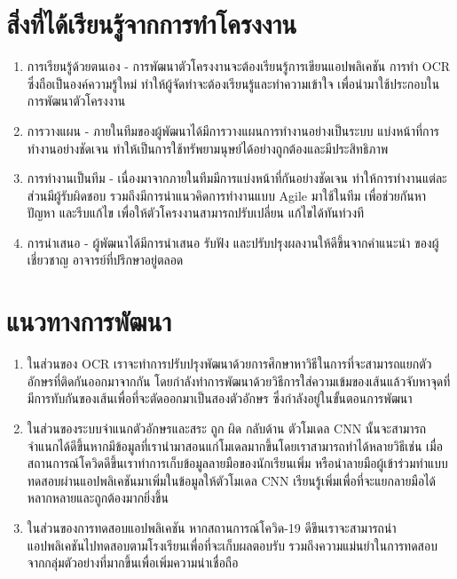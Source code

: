 \documentclass[12pt,oneside,openright,a4paper]{cpe-thai-project}
\begin{document}
\section{สิ่งที่ได้เรียนรู้จากการทำโครงงาน}
\begin{enumerate}
  \item การเรียนรู้ด้วยตนเอง - การพัฒนาตัวโครงงานจะต้องเรียนรู้การเขียนแอปพลิเคชัน
  การทำ OCR ซึ่งถือเป็นองค์ความรู้ใหม่ ทำให้ผู้จัดทำจะต้องเรียนรู้และทำความเข้าใจ
  เพื่อนำมาใช้ประกอบในการพัฒนาตัวโครงงาน
  \item การวางแผน - ภายในทีมของผู้พัฒนาได้มีการวางแผนการทำงานอย่างเป็นระบบ
  แบ่งหน้าที่การทำงานอย่างชัดเจน 
  ทำให้เป็นการใช้ทรัพยามนุษย์ได้อย่างถูกต้องและมีประสิทธิภาพ
  \item การทำงานเป็นทีม - เนื่องมาจากภายในทีมมีการแบ่งหน้าที่กันอย่างชัดเจน
  ทำให้การทำงานแต่ละส่วนมีผู้รับผิดชอบ รวมถึงมีการนำแนวคิดการทำงานแบบ Agile
  มาใช้ในทีม เพื่อช่วยกันหาปัญหา และรีบแก้ไข เพื่อให้ตัวโครงงานสามารถปรับเปลี่ยน
  แก้ไขได้ทันท่วงที
  \item การนำเสนอ - ผู้พัฒนาได้มีการนำเสนอ รับฟัง และปรับปรุงผลงานให้ดีขึ้นจากคำแนะนำ
  ของผู้เชี่ยวชาญ อาจารย์ที่ปรึกษาอยู่ตลอด
\end{enumerate}
\section{แนวทางการพัฒนา}
\begin{enumerate}
  \item ในส่วนของ OCR เราจะทำการปรับปรุงพัฒนาด้วยการศึกษาหาวิธีในการที่จะสามารถแยกตัวอักษรที่ติดกันออกมาจากกัน โดยกำลังทำการพัฒนาด้วยวิธีการใส่ความเข้มของเส้นแล้วจับหาจุดที่มีการทับกันของเส้นเพื่อที่จะตัดออกมาเป็นสองตัวอักษร ซึ่งกำลังอยู่ในขั้นตอนการพัฒนา
  \item ในส่วนของระบบจำแนกตัวอักษรและสระ ถูก ผิด กลับด้าน
        ตัวโมเดล CNN นั้นจะสามารถจำแนกได้ดีขึ้นหากมีข้อมูลที่เรานำมาสอนแก่โมเดลมากขึ้นโดยเราสามารถทำได้หลายวิธีเช่น เมื่อสถานการณ์โควิดดีขึ้นเราทำการเก็บข้อมูลลายมือของนักเรียนเพิ่ม หรือนำลายมือผู้เข้าร่วมทำแบบทดสอบผ่านแอปพลิเคชันมาเพิ่มในข้อมูลให้ตัวโมเดล CNN เรียนรู้เพิ่มเพื่อที่จะแยกลายมือได้หลากหลายและถูกต้องมากยิ่งขึ้น
  \item ในส่วนของการทดสอบแอปพลิเคชัน หากสถานการณ์โควิด-19 ดีขึนเราจะสามารถนำแอปพลิเคชันไปทดสอบตามโรงเรียนเพื่อที่จะเก็บผลตอบรับ รวมถึงความแม่นยำในการทดสอบจากกลุ่มตัวอย่างที่มากขึ้นเพื่อเพิ่มความน่าเชื่อถือ
\end{enumerate}


\nocite{*}


\end{document}
